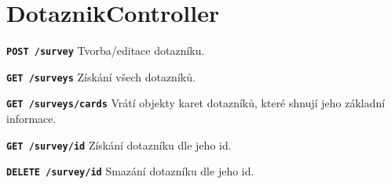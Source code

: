 \section{DotaznikController}
\begin{DESCRIPTION}
\item \texttt{\textbf{POST /survey}} Tvorba/editace dotazníku.
\item \texttt{\textbf{GET /surveys}} Získání všech dotazníků.
\item \texttt{\textbf{GET /surveys/cards}} Vrátí objekty karet dotazníků, které shnují jeho základní informace.
\item \texttt{\textbf{GET /survey/{id}}} Získání dotazníku dle jeho id.
\item \texttt{\textbf{DELETE /survey/{id}}} Smazání dotazníku dle jeho id.
\end{DESCRIPTION}

